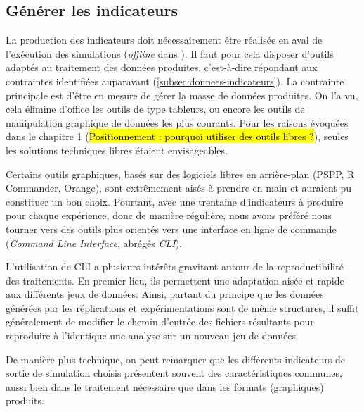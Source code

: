 	\subsection{Générer les indicateurs}

	La production des indicateurs doit nécessairement être réalisée en aval de l'exécution des simulations (\og \textit{offline}\fg{} dans \cite{grignard_agent-based_2017}).
	Il faut pour cela disposer d'outils adaptés au traitement des données produites, c'est-à-dire répondant aux contraintes identifiées auparavant (\autoref{subsec:donnees-indicateurs}).
	La contrainte principale est d'être en mesure de gérer la masse de données produites.
	On l'a vu, cela élimine d'office les outils de type tableurs, ou encore les outils de manipulation graphique de données les plus courants.
	Pour les raisons évoquées dans le chapitre 1 (\hl{Positionnement : pourquoi utiliser des outils libres ?}), seules les solutions techniques libres étaient envisageables.

	Certains outils graphiques, basés sur des logiciels libres en arrière-plan (PSPP, R Commander, Orange), sont extrêmement aisés à prendre en main et auraient pu constituer un bon choix.
	Pourtant, avec une trentaine d'indicateurs à produire pour chaque expérience, donc de manière régulière, nous avons préféré nous tourner vers des outils plus orientés vers une interface en ligne de commande (\textit{Command Line Interface}, abrégés \textit{CLI}).

	L'utilisation de CLI a plusieurs intérêts gravitant autour de la reproductibilité des traitements.
	En premier lieu, ils permettent une adaptation aisée et rapide aux différents jeux de données.
	Ainsi, partant du principe que les données générées par les réplications et expérimentations sont de même structures, il suffit généralement de modifier le chemin d'entrée des fichiers résultants pour reproduire à l'identique une analyse sur un nouveau jeu de données.

	De manière plus technique, on peut remarquer que les différents indicateurs de sortie de simulation choisis présentent souvent des caractéristiques communes, aussi bien dans le traitement nécessaire que dans les formats (graphiques) produits.

